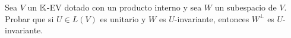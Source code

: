 \item Sea $V$ un $\mathbb{K}$-EV dotado con un producto interno y sea $W$ un subespacio de $V$. Probar que si $U\in L(V)$ es unitario y $W$ es $U$-invariante, entonces $W^\perp$ es $U$-invariante.
    \begin{mdframed}[style=s]
        
    \end{mdframed}